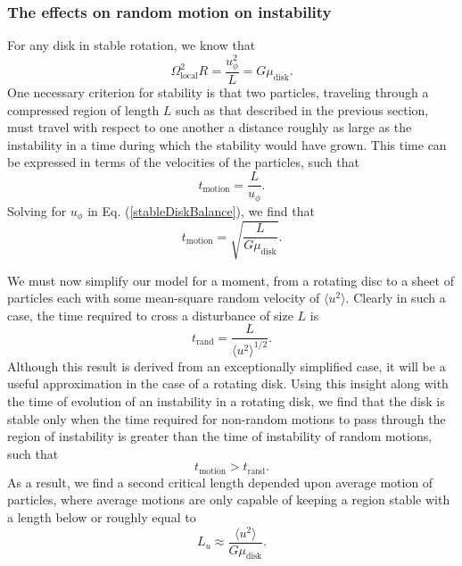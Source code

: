 \documentclass[aps,pra,twocolumn]{revtex4-1}
\begin{document}
\subsubsection{\label{section 3.1.2} The effects on random motion on instability}
For any disk in stable rotation, we know that
\begin{equation}
\Omega_\text{local}^2 R = \frac{u_{\phi}^2}{L} = G \mu_\text{disk}. \label{stableDiskBalance}
\end{equation}
One necessary criterion for stability is that two particles, traveling through a compressed region of length $L$ such as that described in the previous section, must travel with respect to one another a distance roughly as large as the instability in a time during which the stability would have grown.  This time can be expressed in terms of the velocities of the particles, such that 
\begin{equation}
t_\text{motion} = \frac{L}{u_\phi}.
\end{equation}
Solving for $u_\phi$ in Eq. (\ref{stableDiskBalance}), we find that
\begin{equation}
t_\text{motion} = \sqrt{\frac{L}{G\mu_\text{disk}}}.
\end{equation}

We must now simplify our model for a moment, from a rotating disc to a sheet of particles each with some mean-square random velocity of $\langle u^2 \rangle$. Clearly in such a case, the time required to cross a disturbance of size $L$ is
\begin{equation}
t_\text{rand} = \frac{L}{\langle u^2 \rangle^{1/2}}.
\end{equation}
Although this result is derived from an exceptionally simplified case, it will be a useful approximation in the case of a rotating disk.  Using this insight along with the time of evolution of an instability in a rotating disk, we find that the disk is stable only when the time required for non-random motions to pass through the region of instability is greater than the time of instability of random motions, such that
\begin{equation}
t_\text{motion} > t_\text{rand}.
\end{equation}
As a result, we find a second critical length depended upon average motion of particles, where average motions are only capable of keeping a region stable with a length below or roughly equal to
\begin{equation}
L_u \approx \frac{\langle u^2 \rangle}{G\mu_\text{disk}}. \label{crit2.1}
\end{equation}
\end{document}
